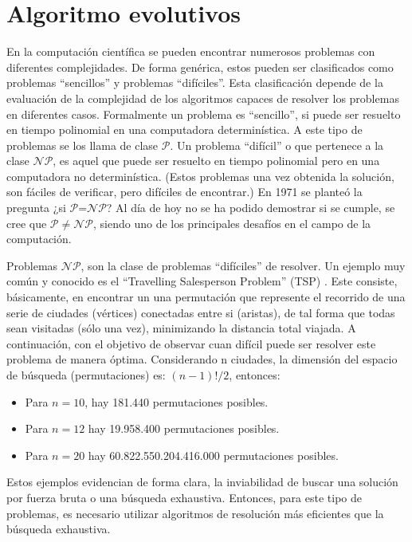 \chapter{Algoritmo evolutivos}\label{Ane1}

En la computación científica se pueden encontrar numerosos problemas con diferentes complejidades. De forma genérica, estos pueden ser clasificados como problemas ``sencillos'' y problemas ``difíciles''. Esta clasificación depende de la evaluación de la complejidad de los algoritmos capaces de resolver los problemas en diferentes casos.
Formalmente un problema es ``sencillo'', si puede ser resuelto en tiempo polinomial en una computadora determinística. A este tipo de problemas se los llama de clase $\mathcal{P}$. Un problema ``difícil'' o que pertenece a la clase $\mathcal{NP}$,  es aquel que puede ser resuelto en tiempo polinomial pero en una computadora no determinística. (Estos problemas una vez obtenida la solución, son fáciles de verificar, pero difíciles de encontrar.)
En 1971 se planteó la pregunta  ¿si $\mathcal{P}$=$\mathcal{NP}$?  Al día de hoy no se ha podido demostrar si se cumple, se cree que $\mathcal{P} \neq \mathcal{NP}$, siendo uno de los principales desafíos en el campo de la computación.

Problemas $\mathcal{NP}$, son la clase de problemas ``difíciles'' de resolver. Un ejemplo muy común y conocido es el ``Travelling Salesperson Problem'' (TSP) . Este consiste, básicamente, en encontrar un una permutación que represente el recorrido de una serie de ciudades (vértices) conectadas entre si (aristas), de tal forma que todas sean visitadas (sólo una vez), minimizando la distancia total viajada.  A continuación, con el objetivo de observar cuan difícil puede ser resolver este problema de manera óptima. Considerando n ciudades, la dimensión del espacio de búsqueda    (permutaciones) es: $(n-1)!/2$, entonces:
\begin{itemize}
	\item Para $n=10$, hay 181.440 permutaciones posibles.
	\item Para $n=12$ hay 19.958.400 permutaciones posibles.
	\item Para $n=20$ hay 60.822.550.204.416.000 permutaciones posibles.
\end{itemize}

Estos ejemplos evidencian de forma clara, la inviabilidad de buscar una solución por fuerza bruta o una búsqueda exhaustiva.
Entonces, para este tipo de problemas, es necesario utilizar algoritmos de resolución más eficientes que la búsqueda exhaustiva. 

